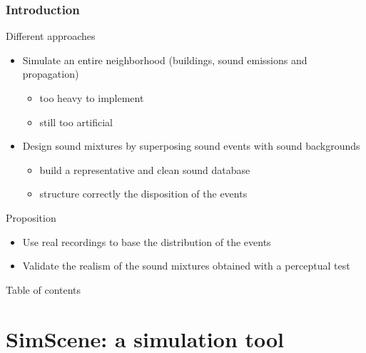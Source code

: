 \documentclass{beamer}
\begin{document}
\begin{frame}[label=pagebanale]
\frametitle{Introduction}


\begin{block}{Different approaches}
\begin{itemize}
	\item Simulate an entire neighborhood (buildings, sound emissions and propagation)
	\begin{itemize}
		\item too heavy to implement\\
		\item still too artificial \\
	\end{itemize}

	\item Design sound mixtures by superposing sound events with sound backgrounds
	\begin{itemize}
		\item build a representative and clean sound database
		\item structure correctly the disposition of the events
	\end{itemize}
\end{itemize}
\end{block}

\begin{block}{Proposition}
\begin{itemize}
	\item Use real recordings to base the distribution of the events
	\item Validate the realism of the sound mixtures obtained with a perceptual test
\end{itemize}

\end{block}


\end{frame}


\begin{frame}{Table of contents}
  \tableofcontents
\end{frame}


\section{SimScene: a simulation tool}
\end{document}
